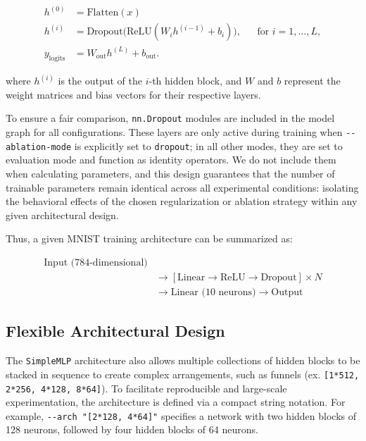 \documentclass[conference]{IEEEtran}
\begin{document}
\begin{equation}
\begin{aligned}
    h^{(0)} &= \text{Flatten}(x) \\
    h^{(i)} &= \text{Dropout} \big( \text{ReLU}(W_i h^{(i-1)} + b_i) \big), 
    &&\text{for } i = 1, \dots, L, \\
    y_{\text{logits}} &= W_{\text{out}} h^{(L)} + b_{\text{out}}.
\end{aligned}
\end{equation}

where $h^{(i)}$ is the output of the $i$-th hidden block, and $W$ and $b$ represent the weight matrices and bias vectors for their respective layers.

To ensure a fair comparison, \verb|nn.Dropout| modules are included in the model graph for all configurations. These layers are only active during training when \verb|--ablation-mode| is explicitly set to \verb|dropout|; in all other modes, they are set to evaluation mode and function as identity operators. We do not include them when calculating parameters, and this design guarantees that the number of trainable parameters remain identical across all experimental conditions: isolating the behavioral effects of the chosen regularization or ablation strategy within any given architectural design.

Thus, a given MNIST training architecture can be summarized as:

\begin{align*}
\text{Input (784-dimensional)}\\
&\rightarrow [\text{Linear} \rightarrow \text{ReLU} \rightarrow \text{Dropout}] \times N \\
&\rightarrow \text{Linear (10 neurons)} \rightarrow \text{Output}
\end{align*}

\subsection{Flexible Architectural Design}

The \verb|SimpleMLP| architecture also allows multiple collections of hidden blocks to be stacked in sequence to create complex arrangements, such as funnels (ex. \verb|[1*512, 2*256, 4*128, 8*64]|). To facilitate reproducible and large-scale experimentation, the architecture is defined via a compact string notation. For example, \verb|--arch "[2*128, 4*64]"| specifies a network with two hidden blocks of 128 neurons, followed by four hidden blocks of 64 neurons.
\end{document}
